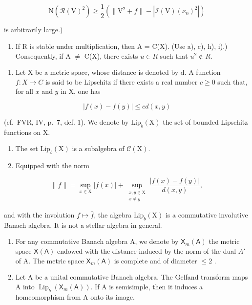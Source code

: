 \[
\mathrm{N} (\mathcal {R} (\mathrm{V}) ^ {2}) \geqslant \frac {1}{2} \left(\| \mathrm{V} ^ {2} + f \| - | \mathcal {I} (\mathrm{V}) (x _ {0}) ^ {2} |\right)
\]

is arbitrarily large.)

\begin{enumerate}
\def\labelenumi{\alph{enumi})}
\setcounter{enumi}{9}
\tightlist
\item
  If R is stable under multiplication, then A = C(X). (Use a), c), h), i).) Consequently, if A \(\neq\) C(X), there exists \(u \in R\) such that \(u^{2} \notin R\).
\end{enumerate}

\begin{enumerate}
\def\labelenumi{\arabic{enumi})}
\setcounter{enumi}{10}
\tightlist
\item
  Let X be a metric space, whose distance is denoted by d. A function \(f: X \to C\) is said to be Lipschitz if there exists a real number \(c \geqslant 0\) such that, for all \(x\) and \(y\) in X, one has
\end{enumerate}

\[
| f (x) - f (y) | \leqslant c d (x, y)
\]

(cf.~FVR, IV, p.~7, def. 1). We denote by \(\mathrm{Lip}_b(\mathrm{X})\) the set of bounded Lipschitz functions on X.

\begin{enumerate}
\def\labelenumi{\alph{enumi})}
\item
  The set \(\mathrm{Lip}_b(\mathrm{X})\) is a subalgebra of \(\mathcal{C}(\mathrm{X})\).
\item
  Equipped with the norm
\end{enumerate}

\[
\| f\| = \sup_{x\in \mathrm{X}}|f(x)| + \sup_{\substack{x,y\in \mathrm{X}\\ x\neq y}}\frac{|f(x) - f(y)|}{d(x,y)},
\]

and with the involution \(f \mapsto \overline{f}\), the algebra \(\mathrm{Lip}_b(\mathrm{X})\) is a commutative involutive Banach algebra. It is not a stellar algebra in general.

\begin{enumerate}
\def\labelenumi{\alph{enumi})}
\setcounter{enumi}{2}
\item
  For any commutative Banach algebra A, we denote by \(\mathsf{X}_{m}(\mathsf{A})\) the metric space \(\mathsf{X}(\mathsf{A})\) endowed with the distance induced by the norm of the dual \(A'\) of A. The metric space \(\mathsf{X}_{m}(\mathsf{A})\) is complete and of diameter \(\leqslant 2\) .
\item
  Let A be a unital commutative Banach algebra. The Gelfand transform maps A into \(\operatorname{Lip}_{b}(\mathsf{X}_{m}(\mathsf{A}))\). If A is semisimple, then it induces a homeomorphism from A onto its image.
\end{enumerate}

